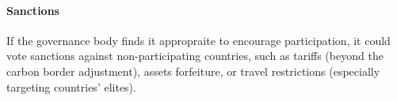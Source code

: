 \documentclass[12pt,english]{article}
\begin{document}





\paragraph{Sanctions}

If the governance body finds it appropraite to encourage participation, it could vote sanctions against non-participating countries, such as tariffs (beyond the carbon border adjustment), assets forfeiture, or travel restrictions (especially targeting countries' elites). 

\renewcommand{\url}[1]{\href{#1}{Link}} %

\end{document}
